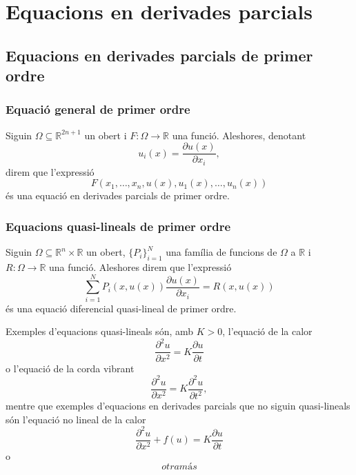 \documentclass[../Apunts.tex]{subfiles}
\begin{document}
\chapter{Equacions en derivades parcials}
\section{Equacions en derivades parcials de primer ordre}
	\subsection{Equació general de primer ordre}
	\begin{definition}
		Siguin \(\Omega\subseteq\mathbb{R}^{2n+1}\) un obert i \(F\colon\Omega\longrightarrow\mathbb{R}\) una funció. Aleshores, denotant
		\[u_{i}(x)=\frac{\partial u(x)}{\partial x_{i}},\]
		direm que l'expressió
		\[F(x_{1},\dots,x_{n},u(x),u_{1}(x),\dots,u_{n}(x))\]
		és una equació en derivades parcials de primer ordre.
	\end{definition}
	\subsection{Equacions quasi-lineals de primer ordre}
	\begin{definition}
		\label{def:equació diferencial quasi lineal}
		Siguin \(\Omega\subseteq\mathbb{R}^{n}\times\mathbb{R}\) un obert, \(\{P_{i}\}_{i=1}^{N}\) una família de funcions de \(\Omega\) a \(\mathbb{R}\) i \(R\colon\Omega\longrightarrow\mathbb{R}\) una funció. Aleshores direm que l'expressió
		\[\sum_{i=1}^{N}P_{i}(x,u(x))\frac{\partial u(x)}{\partial x_{i}}=R(x,u(x))\]
		és una equació diferencial quasi-lineal de primer ordre.
	\end{definition}
	\begin{example}
		Exemples d'equacions quasi-lineals són, amb \(K>0\), l'equació de la calor
		\[\frac{\partial^{2} u}{\partial x^{2}}=K\frac{\partial u}{\partial t}\]
		o l'equació de la corda vibrant
		\[\frac{\partial^{2} u}{\partial x^{2}}=K\frac{\partial^{2} u}{\partial t^{2}},\]
		mentre que exemples d'equacions en derivades parcials que no siguin quasi-lineals són l'equació no lineal de la calor
		\[\frac{\partial^{2} u}{\partial x^{2}}+f(u)=K\frac{\partial u}{\partial t}\]
		o
		\[otra más\]
	\end{example}
	
\end{document}
